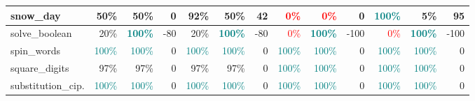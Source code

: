 \begin{table}[!h]
{\begin{tabular}{|p{2.9cm}|rr|r|rr|r||rr|r|rr|r|}
		snow\_day          & 50\%                             & \multicolumn{1}{r|}{50\%}                             & \cellcolor[HTML]{FFFFFF}0   & \textbf{92\%}                    & \multicolumn{1}{r|}{50\%}                             & \cellcolor[HTML]{FFD594}42  & \textcolor{red}{0\%}        & \multicolumn{1}{r|}{\textcolor{red}{0\%}}    & \cellcolor[HTML]{FFFFFF}0    & \textcolor{teal}{\textbf{100\%}} & \multicolumn{1}{r|}{5\%}                              & \cellcolor[HTML]{FF9F0D}95   \\ \hline
		solve\_boolean     & 20\%                             & \multicolumn{1}{r|}{\textcolor{teal}{\textbf{100\%}}} & \cellcolor[HTML]{6E9EEC}-80 & 20\%                             & \multicolumn{1}{r|}{\textcolor{teal}{\textbf{100\%}}} & \cellcolor[HTML]{6E9EEC}-80 & \textcolor{red}{0\%}        & \multicolumn{1}{r|}{\textcolor{teal}{\textbf{100\%}}} & \cellcolor[HTML]{4A86E8}-100 & \textcolor{red}{0\%}             & \multicolumn{1}{r|}{\textcolor{teal}{\textbf{100\%}}} & \cellcolor[HTML]{4A86E8}-100 \\ \hline
		spin\_words        & \textcolor{teal}{100\%}          & \multicolumn{1}{r|}{\textcolor{teal}{100\%}}          & \cellcolor[HTML]{FFFFFF}0   & \textcolor{teal}{100\%}          & \multicolumn{1}{r|}{\textcolor{teal}{100\%}}          & \cellcolor[HTML]{FFFFFF}0   & \textcolor{teal}{100\%}     & \multicolumn{1}{r|}{\textcolor{teal}{100\%}} & \cellcolor[HTML]{FFFFFF}0    & \textcolor{teal}{100\%}          & \multicolumn{1}{r|}{\textcolor{teal}{100\%}}          & \cellcolor[HTML]{FFFFFF}0    \\ \hline
		square\_digits     & 97\%                             & \multicolumn{1}{r|}{97\%}                             & \cellcolor[HTML]{FFFFFF}0   & 97\%                             & \multicolumn{1}{r|}{97\%}                             & \cellcolor[HTML]{FFFFFF}0   & \textcolor{teal}{100\%}     & \multicolumn{1}{r|}{\textcolor{teal}{100\%}} & \cellcolor[HTML]{FFFFFF}0    & \textcolor{teal}{100\%}          & \multicolumn{1}{r|}{\textcolor{teal}{100\%}}          & \cellcolor[HTML]{FFFFFF}0    \\ \hline
		substitution\_cip. & \textcolor{teal}{100\%}          & \multicolumn{1}{r|}{\textcolor{teal}{100\%}}          & \cellcolor[HTML]{FFFFFF}0   & \textcolor{teal}{100\%}          & \multicolumn{1}{r|}{\textcolor{teal}{100\%}}          & \cellcolor[HTML]{FFFFFF}0   & \textcolor{teal}{100\%}     & \multicolumn{1}{r|}{\textcolor{teal}{100\%}} & \cellcolor[HTML]{FFFFFF}0    & \textcolor{teal}{100\%}          & \multicolumn{1}{r|}{\textcolor{teal}{100\%}}          & \cellcolor[HTML]{FFFFFF}0    \\ \hline

\end{tabular}}
\end{table}
